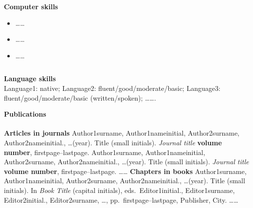 \documentclass[10pt]{amsart}
\begin{document}
	
	
	{\large {\bf Computer skills}} \\[-.08cm] 
	\underline{\hspace{6in}} 
	\begin{itemize}
		\item  \ldots\ldots  
		\item  \ldots\ldots 	\item  \ldots\ldots 		
	\end{itemize}
	
	$\,$\newline
	
	
	{\large {\bf Language skills}} \\[-.08cm] 
	\underline{\hspace{6in}} \newline
	Language1: native; Language2: fluent/good/moderate/basic;  Language3: fluent/good/moderate/basic (written/spoken); \ldots\ldots .  
	\newline
	\newline
	\newline
	
	
	
	{\large {\bf Publications}} \\[-.08cm] 
	\underline{\hspace{6in}} \\[.2cm] 
	{\bf Articles in journals}  \newline
	Author1surname, Author1nameinitial, Author2surname, Author2nameinitial., \ldots    (year). Title (small initials).   {\it Journal title} {\bf volume number}, firstpage--lastpage. \newline\newline
	Author1surname, Author1nameinitial, Author2surname, Author2nameinitial., \ldots    (year). Title (small initials).   {\it Journal title} {\bf volume number}, firstpage--lastpage. 
	\newline
	\newline
	\ldots\ldots
	\newline
	\newline
	{\bf Chapters in books}  \newline
	Author1surname, Author1nameinitial, Author2surname, Author2nameinitial., \ldots    (year). Title (small initials).  In {\it Book Title} (capital initials), eds.\ Editor1initial., Editor1surname, Editor2initial., Editor2surname, \ldots, pp.\ firstpage--lastpage, Publisher, City.\newline\newline
	\newline
	\newline
	\ldots\ldots
	\newline
	\newline
	
\end{document}
